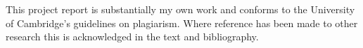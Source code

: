 
\begin{declaration}

This project report is substantially my own work and conforms to the
University of Cambridge's guidelines on plagiarism. Where reference has been
made to other research this is acknowledged in the text and bibliography.

\vspace{1.5cm}



\end{declaration}
